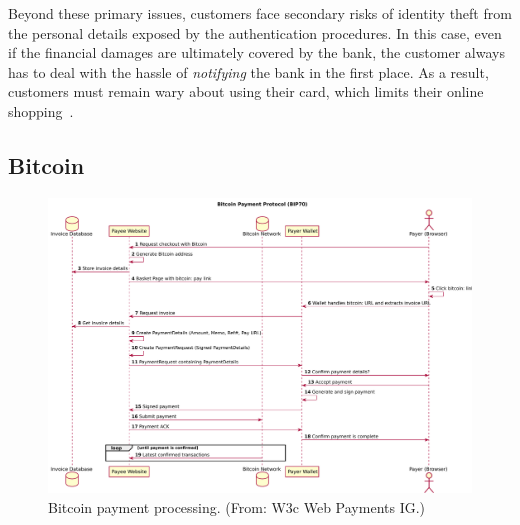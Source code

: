 \documentclass{llncs}
\begin{document}
Beyond these primary issues, customers face secondary risks of
identity theft from the personal details exposed by the authentication
procedures. In this case, even if the financial damages are ultimately
covered by the bank, the customer always has to deal with the hassle
of {\em notifying} the bank in the first place.  As a result,
customers must remain wary about using their card, which limits their
online shopping~\cite[p. 50]{ibi2014}.
%



\subsection{Bitcoin}

\begin{figure}[b!]
\includegraphics[width=\textwidth]{figs/bitcoin.pdf}
\caption{Bitcoin payment processing. (From: W3c Web Payments IG.)}
\label{fig:bitcoin}
\end{figure}
\end{document}
